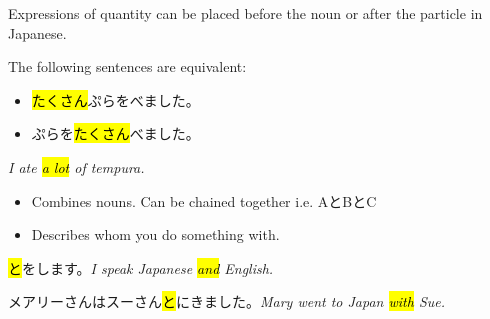    {
    Expressions of quantity can be placed before the noun or after the particle in Japanese.
    
    The following sentences are equivalent:
    \begin{itemize}
        \item \hl{たくさん}ぷらをべました。
        \item {}ぷらを\hl{たくさん}べました。
    \end{itemize}
    \textit{I ate \hl{a lot} of tempura.}
    }

    {
    \begin{itemize}
        \item Combines nouns. Can be chained together i.e. AとBとC
        \item Describes whom you do something with.
    \end{itemize}
    
    \hl{と}をします。\textit{I speak Japanese \hl{and} English.}
    
    メアリーさんはスーさん\hl{と}にきました。\textit{Mary went to Japan \hl{with} Sue.}
    }